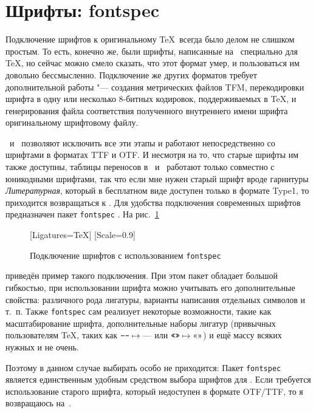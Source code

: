 \documentclass[a4paper,12pt,hyphens]{article}
\newcommand\softname[1]{\textit{#1}}
\newcommand\package[1]{\texttt{#1}}
\newcommand\lcmd[1]{\texttt{#1}}
\begin{document}
\section{Шрифты: fontspec}
Подключение шрифтов к оригинальному \TeX\ всегда было делом не слишком простым.
То есть, конечно же, были шрифты, написанные на \METAFONT\ специально для
\TeX, но сейчас можно смело сказать, что этот формат умер, и пользоваться
им довольно бессмысленно. Подключение же других форматов требует
дополнительной работы "--- создания метрических файлов TFM, перекодировки
шрифта в одну или несколько 8-битных кодировок, поддерживаемых в \TeX,
и генерирования файла соответствия полученного внутреннего имени шрифта
оригинальному шрифтовому файлу.

\XeTeX\ и \LuaTeX\ позволяют исключить все эти этапы и работают
непосредственно со шрифтами в форматах TTF и OTF. И несмотря на то, что старые
шрифты им также доступны, таблицы переносов в \XeTeX\ и \LuaTeX\ работают только
совместно с юникодными шрифтами, так что если мне нужен старый шрифт вроде гарнитуры
\softname{Литературная}, который в бесплатном виде доступен только в формате Type1, то приходится
возвращаться к \pdfLaTeX. Для удобства подключения современных шрифтов
предназначен пакет \package{fontspec} \parencite{ctan-fontspec}.
На рис.~\ref{fontspec1}
\begin{figure}[tp]
\begin{latexcode}
\usepackage{fontspec}
\setmainfont{STIX Two Text}[Ligatures=TeX]
\setmonofont{PT Mono}[Scale=0.9]
\end{latexcode}
\caption{Подключение шрифтов с использованием
\package{fontspec}}\label{fontspec1}
\end{figure}
приведён пример такого подключения. При этом пакет обладает большой
гибкостью, при использовании шрифта можно учитывать его дополнительные
свойства: различного рода лигатуры, варианты написания отдельных
символов и т.~п. Также \package{fontspec} сам реализует некоторые
возможности, такие как масштабирование шрифта, дополнительные наборы
лигатур (привычных пользователям \TeX, таких как
$\mbox{\lcmd{---}}\mapsto\text{---}$ или $\mbox{\lcmd{<<>>}}\mapsto\text{<<>>}$)
и ещё массу всяких нужных и не очень.

Поэтому в данном случае выбирать особо не приходится: Пакет \package{fontspec}
является единственным удобным средством выбора шрифтов для \LuaLaTeX. Если требуется использование
старого шрифта, который недоступен в формате OTF/TTF, то я возвращаюсь на~\pdfLaTeX.
\end{document}
